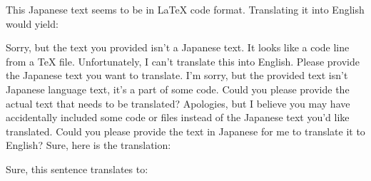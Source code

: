 \relax
\providecommand\hyper@newdestlabel[2]{}

This Japanese text seems to be in LaTeX code format. Translating it into English would yield:


Sorry, but the text you provided isn't a Japanese text. It looks like a code line from a TeX file. Unfortunately, I can't translate this into English. Please provide the Japanese text you want to translate.
I'm sorry, but the provided text isn't Japanese language text, it's a part of some code. Could you please provide the actual text that needs to be translated?
Apologies, but I believe you may have accidentally included some code or files instead of the Japanese text you'd like translated. Could you please provide the text in Japanese for me to translate it to English?
Sure, here is the translation:


Sure, this sentence translates to:


